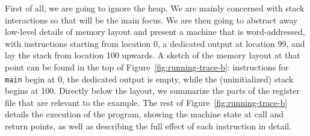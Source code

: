 \documentclass[acmsmall,review,anonymous]{acmart}\settopmatter{printfolios=true,printccs=false,printacmref=false}
\begin{document}
First of all, we are going to ignore the heap. We are mainly concerned
with stack interactions so that will be the main focus.  We are then going
to abstract away low-level details of memory layout and present a
machine that is word-addressed, with instructions starting from
location 0, a dedicated output at location 99, and lay the stack from
location 100 upwards. 
%
A sketch of the memory layout at that point can be found in the top of
Figure~\ref{fig:running-trace-b}: instructions for {\tt main} begin at
0, the dedicated output is empty, while the (uninitialized) stack
begins at 100. Directly below the layout, we summarize the parts of
the register file that are relevant to the example.
%
The rest of Figure~\ref{fig:running-trace-b} details the execution of the
program, showing the machine state at call and return points, as well
as describing the full effect of each instruction in detail.
\end{document}

